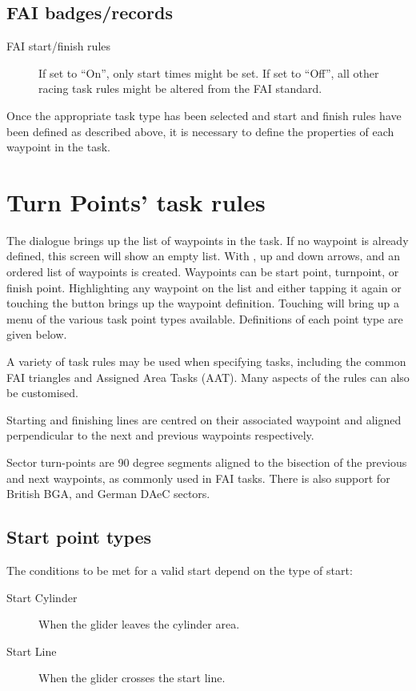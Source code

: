 \subsection*{FAI badges/records}
  \begin{description}
  \item [FAI start/finish rules] If set to ``On'', only start times might be set.
  If set to ``Off'', all other racing task rules might be altered from the FAI standard.
  \end{description}

Once the appropriate task type has been selected and start and finish rules
have been defined as described above, it is necessary to define the properties
of each waypoint in the task.

\section{Turn Points' task rules}\label{sec:task-rules}

The  dialogue brings up the list of waypoints in the task.
 If no waypoint is already defined, this screen
will show an empty list. With , up and down arrows, and
 an ordered list of waypoints is created.
Waypoints can be start point, turnpoint, or finish point.
Highlighting any waypoint on the list and either tapping it again or
touching the  button brings up the waypoint definition.
Touching  will bring up a menu of the various task point
types available.  Definitions of each point type are given below.

A variety of task rules may be used when specifying tasks, including
the common FAI triangles and Assigned Area Tasks (AAT).  Many aspects
of the rules can also be customised.

Starting and finishing lines are centred on their associated waypoint
and aligned perpendicular to the next and previous waypoints
respectively.

Sector turn-points are 90 degree segments aligned to the bisection of
the previous and next waypoints, as commonly used in FAI tasks.
There is also support for British BGA, and German DAeC sectors.

\subsection*{Start point types}
The conditions to be met for a valid start depend on the type of start:
\begin{description}
\item[Start Cylinder] When the glider leaves the cylinder area.
\item[Start Line] When the glider crosses the start line.
\end{description}


